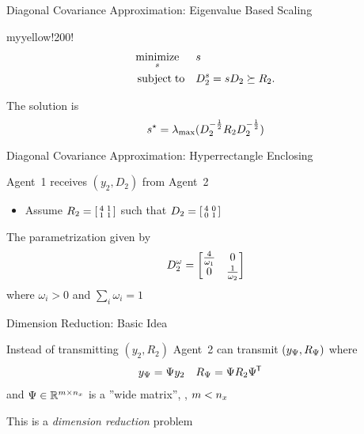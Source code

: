 \documentclass[aspectratio=1610]{beamer}
\begin{document}
\begin{frame}{Diagonal Covariance Approximation: Eigenvalue Based Scaling}

\begin{rfshadedcolorbox}[title={Eigenvalue Based Scaling}]{myyellow!200!}
    \begin{equation*}
    \begin{aligned}
    	& \underset{s}{\minimize} & & s \\
    	& \subjectto & & \Ds_2 = sD_2 \succeq R_2.
    \end{aligned}
    \end{equation*}
\end{rfshadedcolorbox}

\vspace{1em}

The solution is
\[
    s^\star=\lambdamax(D_2\invsqrt R_2D_2\invsqrt)
\]

\end{frame}


\begin{frame}{Diagonal Covariance Approximation: Hyperrectangle Enclosing}

Agent~1 receives $(y_2,D_2)$ from Agent~2
\begin{itemize}
    \item Assume $R_2=\BBSM4&1\\1&1\EBSM$ such that $D_2=\BBSM4&0\\0&1\EBSM$
\end{itemize}

\begin{figure}
    \centering
    \begin{tikzpicture}[scale=.85]
        
    \end{tikzpicture}
\end{figure}


The parametrization given by
\begin{equation*}
    D_2^\omega = \BBM \frac{4}{\omega_1}&0 \\ 0&\frac{1}{\omega_2} \EBM
\end{equation*}
where $\omega_i>0$ and $\sum_i\omega_i=1$

\end{frame}


\begin{frame}{Dimension Reduction: Basic Idea}

Instead of transmitting $(y_2,R_2)$ Agent~2 can transmit $(\yM,\RM)$ where
\begin{align*}
    \yM &= \M y_2 &
    \RM &= \M R_2\Mt
\end{align*}
and $\M\in\realsmnx$ is a ''wide matrix'', \ie, $m<\nx$

\vspace{1em}

This is a \emph{dimension reduction} problem

\end{frame}
\end{document}
